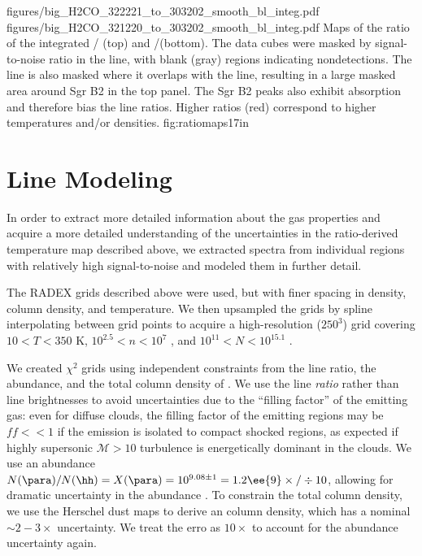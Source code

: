 \FigureTwoAA
{figures/big_H2CO_322221_to_303202_smooth_bl_integ.pdf}
{figures/big_H2CO_321220_to_303202_smooth_bl_integ.pdf}
{Maps of the ratio of the integrated \para \threetwotwo / \threeohthree (top)
and \threetwoone/\threeohthree (bottom).  The data cubes were masked by
signal-to-noise ratio in the \threeohthree line, with blank (gray) regions
indicating nondetections.  The \threetwotwo line is also masked where it
overlaps with the \methanol \fourtwotwo line, resulting in a large masked area
around Sgr B2 in the top panel.  The Sgr B2 peaks also exhibit \formaldehyde absorption and therefore
bias the line ratios.  Higher ratios (red) correspond to higher
temperatures and/or densities.  
}
{fig:ratiomaps}{1}{7in}

\section{Line Modeling}
\label{sec:linemodeling}
In order to extract more detailed information about the gas properties and
acquire a more detailed understanding of the uncertainties in the ratio-derived
temperature map described above, we extracted spectra from individual regions
with relatively high signal-to-noise and modeled them in further detail.

The RADEX grids described above were used, but with finer spacing in density,
column density, and temperature.  We then upsampled the grids by spline
interpolating between grid points to acquire a high-resolution ($250^3$) grid
covering $10<T<350$ K, $10^{2.5} < n < 10^7$ \percc, and $10^{11} < N <
10^{15.1}$ \persc\perkmspc.

We created $\chi^2$ grids using independent constraints from the line ratio,
the \formaldehyde abundance, and the total column density of \hh.  We use the
line \emph{ratio} rather than line brightnesses to avoid uncertainties due to
the ``filling factor'' of the emitting gas: even for diffuse clouds, the
filling factor of the emitting regions may be $ff<<1$ if the emission is
isolated to compact shocked regions, as expected if highly supersonic
$\mathcal{M}>10$ turbulence is energetically dominant in the clouds.  We use an
abundance $N(\para)/N(\hh) = X(\para) = 10^{9.08\pm1} = 1.2\ee{9} \times/\div
10$, allowing for dramatic uncertainty in the \formaldehyde abundance
\citep{Ginsburg2013a,Carey1998a,Wootten1978a,Mundy1987a}.  To constrain the
total column density, we use the Herschel dust maps to derive an \hh column
density, which has a nominal $\sim2-3\times$ uncertainty.  We treat the erro as
$10\times$ to account for the abundance uncertainty again.

